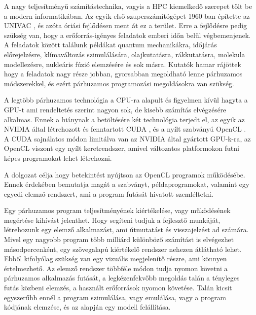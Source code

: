 
A nagy teljesítményű számítástechnika, vagyis a HPC kiemelkedő szerepet tölt be a modern informatikában. Az egyik első szuperszámítógépet 1960-ban építette az UNIVAC \cite{larc}, és azóta óriási fejlődésen ment át ez a terület. Erre a fejlődésre pedig szükség van, hogy a erőforrás-igényes feladatok emberi időn belül végbemenjenek. A feladatok között találunk példákat quantum mechanikákra, időjárás előrejelzésre, klímaváltozás szimulálására, olajkutatásra, rákkutatásra, molekula modellezésre, nukleáris fúzió elemzésére és sok másra. Kutatók hamar rájöttek hogy a feladatok nagy része jobban, gyorsabban megoldható lenne párhuzamos módszerekkel, és ezért párhuzamos programozási megoldásokra van szükség.

A legtöbb párhuzamos technológia a CPU-ra alapult és figyelmen kívül hagyta a GPU-t ami rendeltetés szerint nagyon sok, de kisebb számítás elvégzésére alkalmas. Ennek a hiánynak a betöltésére két technológia terjedt el, az egyik az NVIDIA által létrehozott és fenntartott CUDA \cite{cuda}, és a nyílt szabványú OpenCL \cite{opencl}. A CUDA sajnálatos módon limitálva van az NVIDIA által gyártott GPU-k-ra, az OpenCL viszont egy nyílt keretrendszer, amivel változatos platformokon futni képes programokat lehet létrehozni.

 A dolgozat célja hogy betekintést nyújtson az OpenCL programok működésébe. Ennek érdekében bemutatja magát a szabványt, példaprogramokat, valamint egy egyedi elemző rendszert, ami a program futását hivatott szemléltetni.

Egy párhuzamos program teljesítményének kiértékelése, vagy működésének megértése kihívást jelenthet. Hogy segíteni tudjuk a fejlesztő munkáját, létrehozunk egy elemző alkalmazást, ami útmutatást és visszajelzést ad számára. Mivel egy nagyobb program több milliárd különböző számítást is elvégezhet másodpercenként, egy szövegalapú kiértékelő rendszer nehezen átlátható lehet. Ebből kifolyólag szükség van egy vizuális megjelenítő részre, ami könnyen értelmezhető. Az elemző rendszer többféle módon tudja nyomon követni a párhuzamos alkalmazás futását, a legkézenfekvőbb megoldás talán a tényleges futás közbeni elemzés, a használt erőforrások nyomon követése. Talán kicsit egyszerűbb ennél a program szimulálása, vagy emulálása, vagy a program kódjának elemzése, és az alapján egy modell felállítása.
